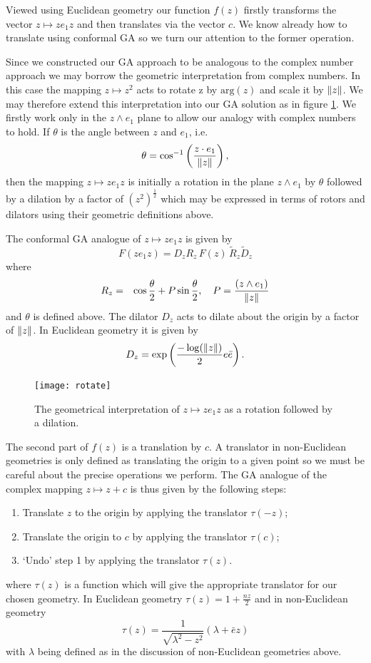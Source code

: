 Viewed using Euclidean geometry our function $f(z)$ firstly transforms the vector
$z \mapsto ze_1z$ and then translates via the vector $c$. We know already how to translate
using conformal GA so we turn our attention to the former operation.

Since we constructed our GA approach to be analogous to the complex number approach we
may borrow the geometric interpretation from complex numbers. In this case the mapping 
$z \mapsto z^2$ acts to rotate z by $\mathrm{arg}(z)$ and scale it by
$\left\Vert z \right\Vert$. We may therefore extend this interpretation into our GA solution as in
figure \ref{fig:rotate}. We firstly work only in the $z \wedge e_1$ plane to allow
our analogy with complex numbers to hold. If $\theta$ is the angle between $z$ and
$e_1$, i.e.
\[
\theta = \cos^{-1}\left(\frac{z \cdot e_1}{\left\Vert z \right\Vert}\right),
\] 
then the mapping $z \mapsto ze_1z$ is initially a rotation in the plane $z \wedge e_1$
by $\theta$ followed by a dilation by a factor of $(z^2)^\frac{1}{2}$ 
which may be expressed in terms of rotors and dilators using their geometric
definitions above.

\begin{definition}
The conformal GA analogue of $z \mapsto ze_1z$ is given by
\[
F(ze_1z) = D_z R_z\,F(z)\,\tilde{R}_z \tilde{D}_z
\]
where
\begin{eqnarray*}
R_z & = & \cos \frac{\theta}{2} + P \sin \frac{\theta}{2},
    \quad
P = \frac{(z \wedge e_1)}{\left\Vert z \right\Vert}
\end{eqnarray*}
and $\theta$ is defined above.
The dilator $D_z$ acts to dilate about the origin by a factor of
$\left\Vert z \right\Vert$. In Euclidean geometry it is given by
\[
D_z = \exp\left( \frac{-\log(\left\Vert z \right\Vert)}{2} e\bar{e} \right).
\]
\end{definition}

\begin{figure}
\centering
\texttt{[image: rotate]}
\caption{\label{fig:rotate}%
  The geometrical interpretation of $z \mapsto ze_1z$ as a rotation followed by a dilation.
}
\end{figure}

The second part of $f(z)$ is a translation by $c$. A translator in non-Euclidean
geometries is only defined as translating the origin to a given point so we must be
careful about the precise operations we perform. The GA analogue of the
complex mapping $z \mapsto z + c$ is thus given by the following steps:
\begin{enumerate}
\item Translate $z$ to the origin by applying the translator $\tau(-z)$;
\item Translate the origin to $c$ by applying the translator $\tau(c)$;
\item `Undo' step 1 by applying the translator $\tau(z)$.
\end{enumerate}
where $\tau(z)$ is a function which will give the appropriate translator for our 
chosen geometry. In Euclidean geometry $\tau(z) = 1 + \frac{nz}{2}$ and in
non-Euclidean geometry
\[
\tau(z) = \frac{1}{\sqrt{\lambda^2 - z^2}}(\lambda + \bar{e}z)
\]
with $\lambda$ being defined as in the discussion of non-Euclidean geometries above.

